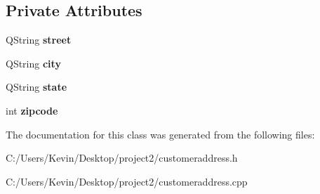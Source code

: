 \subsection*{Private Attributes}
\begin{DoxyCompactItemize}
\item 
\mbox{\label{class_customer_address_a851af80ca3cdcfd515ed0fb53bd3d2c0}} 
Q\+String {\bfseries street}
\item 
\mbox{\label{class_customer_address_a5989947544551ea31d35f792e6406305}} 
Q\+String {\bfseries city}
\item 
\mbox{\label{class_customer_address_a0b0e227772c7d19c4fe958d49c18c721}} 
Q\+String {\bfseries state}
\item 
\mbox{\label{class_customer_address_a984c7a1f1c9310549046a6d15fa5a1e9}} 
int {\bfseries zipcode}
\end{DoxyCompactItemize}


The documentation for this class was generated from the following files\+:\begin{DoxyCompactItemize}
\item 
C\+:/\+Users/\+Kevin/\+Desktop/project2/customeraddress.\+h\item 
C\+:/\+Users/\+Kevin/\+Desktop/project2/customeraddress.\+cpp\end{DoxyCompactItemize}
